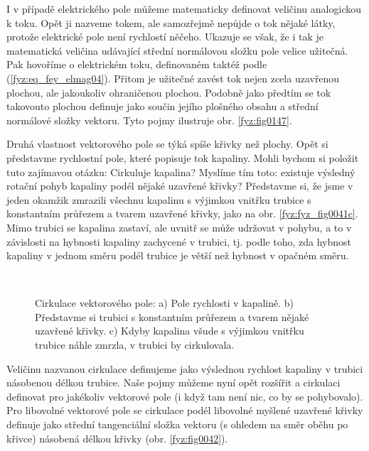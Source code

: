 
    I v případě elektrického pole můžeme matematicky definovat veličinu analogickou k toku. Opět ji
    nazveme tokem, ale samozřejmě nepůjde o tok nějaké látky, protože elektrické pole není rychlostí
    něčeho. Ukazuje se však, že i tak je matematická veličina udávající střední normálovou složku
    pole velice užitečná. Pak hovoříme o elektrickém toku, definovaném taktéž podle
    (\ref{fyz:eq_fey_elmag04}). Přitom je užitečné zavést tok nejen zcela uzavřenou plochou, ale
    jakoukoliv ohraničenou plochou. Podobně jako předtím se tok takovouto plochou definuje jako
    součin jejího plošného obsahu a střední normálové složky vektoru. Tyto pojmy ilustruje obr.
    \ref{fyz:fig0147}. 
    
    Druhá vlastnost vektorového pole se týká spíše křivky než plochy. Opět si představme rychlostní 
    pole, které popisuje tok kapaliny. Mohli bychom si položit tuto zajímavou otázku: Cirkuluje 
    kapalina? Myslíme tím toto: existuje výsledný rotační pohyb kapaliny podél nějaké uzavřené 
    křivky? Představme si, že jsme v jeden okamžik zmrazili všechnu kapalinu s výjimkou vnitřku 
    trubice s konstantním průřezem a tvarem uzavřené křivky, jako na obr. \ref{fyz:fyz_fig0041c}. 
    Mimo trubici se kapalina zastaví, ale uvnitř se může udržovat v pohybu, a to v závislosti na 
    hybnosti kapaliny zachycené v trubici, tj. podle toho, zda hybnost kapaliny v jednom směru 
    podél trubice je větší než hybnost v opačném směru.  

    \begin{figure}[ht!]
      \centering
        \\
      \caption{Cirkulace vektorového pole: a) Pole rychlosti v kapalině. b) Představme si trubici s
               konstantním průřezem a tvarem nějaké uzavřené křivky. c) Kdyby kapalina všude s
               výjimkou vnitřku trubice náhle zmrzla, v trubici by cirkulovala.
               \cite[s.~18]{Feynman02}}
      \label{fyz:fig0041}
    \end{figure}    

    Veličinu nazvanou cirkulace definujeme jako výslednou rychlost kapaliny v trubici násobenou 
    délkou trubice. Naše pojmy můžeme nyní opět rozšířit a cirkulaci definovat pro jakékoliv 
    vektorové pole (i když tam není nic, co by se pohybovalo). Pro libovolné vektorové pole se 
    cirkulace podél libovolné myšlené uzavřené křivky definuje jako střední tangenciální složka 
    vektoru (s ohledem na směr oběhu po křivce) násobená délkou křivky (obr. \ref{fyz:fig0042}). 

